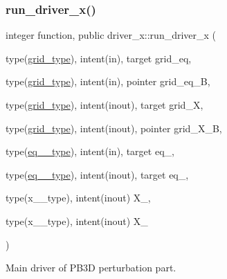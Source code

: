 \subsubsection{\texorpdfstring{run\+\_\+driver\+\_\+x()}{run\_driver\_x()}}
{\footnotesize\ttfamily integer function, public driver\+\_\+x\+::run\+\_\+driver\+\_\+x (\begin{DoxyParamCaption}\item[{type(\hyperlink{structgrid__vars_1_1grid__type}{grid\+\_\+type}), intent(in), target}]{grid\+\_\+eq,  }\item[{type(\hyperlink{structgrid__vars_1_1grid__type}{grid\+\_\+type}), intent(in), pointer}]{grid\+\_\+eq\+\_\+B,  }\item[{type(\hyperlink{structgrid__vars_1_1grid__type}{grid\+\_\+type}), intent(inout), target}]{grid\+\_\+X,  }\item[{type(\hyperlink{structgrid__vars_1_1grid__type}{grid\+\_\+type}), intent(inout), pointer}]{grid\+\_\+\+X\+\_\+B,  }\item[{type(\hyperlink{structeq__vars_1_1eq__1__type}{eq\+\_\+1\+\_\+type}), intent(in), target}]{eq\+\_,  }\item[{type(\hyperlink{structeq__vars_1_1eq__2__type}{eq\+\_\+2\+\_\+type}), intent(inout), target}]{eq\+\_,  }\item[{type(x\+\_\+1\+\_\+type), intent(inout)}]{X\+\_,  }\item[{type(x\+\_\+2\+\_\+type), intent(inout)}]{X\+\_ }\end{DoxyParamCaption})}



Main driver of P\+B3D perturbation part. 


